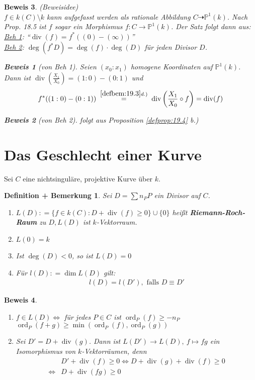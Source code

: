 \documentclass[a4paper,12pt]{report}
\theoremstyle{break}
\newtheorem{DefBem}[Def]{Definition + Bemerkung}
\theoremstyle{nonumberbreak}
\theoremstyle{nonumberplain}
\newtheorem{Bew}{Beweis}
\newcommand{\emp}[1]{\textbf{\emph{#1}}}
\newcommand{\begriff}[1]{{\index{#1}}\emp{#1}}
\newcommand{\defeqr}[0]{\mathrel{\mathop:}=}
\newcommand{\gleichwegen}[1]{\ensuremath{\DOTSB\;\stackrel{#1}{=}\;}}
\DeclareMathOperator{\ord}{ord}
\begin{document}
\begin{Bew}
(Beweisidee)\\
$f\in k(C)\setminus k$ kann aufgefasst werden als rationale Abbildung $C\dashrightarrow\mathbb{P}^1(k)$. Nach Prop. 18.5 ist $f$ sogar ein Morphismus $f: C \rightarrow\mathbb{P}^1(k)$. Der Satz folgt dann aus:\\
\underline{Beh 1}: ``$\operatorname{div}(f)=f^*((0)-(\infty))$''\\
\underline{Beh 2}: $\deg(f^*D)= \deg(f)\cdot\deg(D)$ für jeden Divisor $D$. 
\begin{Bew}[von Beh 1]
  Seien $(x_0:x_1)$ homogene Koordinaten auf $\mathbb P^1(k)$. Dann ist $\operatorname{div}(\frac{X_1}{X_0})=(1:0)-(0:1)$ und 
  \begin{align*}
    f^*((1:0)-(0:1))\gleichwegen{\ref{defbem:19.3} d.)}\operatorname{div}\left(\frac{X_1}{X_0}\circ f\right)=\operatorname{div}(f)
  \end{align*}
\end{Bew}
\begin{Bew}[von Beh 2]
  folgt aus Proposition \ref{defprop:19.4} b.)
\end{Bew}
\end{Bew}

\section{Das Geschlecht einer Kurve}
Sei $C$ eine nichtsinguläre, projektive Kurve über $k$.
\begin{DefBem}
  \label{defbem:20.1}
  Sei $D=\sum n_PP$ ein Divisor auf $C$. 
  \begin{enumerate}
  \item $L(D)\defeqr\{f\in k(C):D+\operatorname{div}(f)\geq0\}\cup\{0\}$ heißt \begriff{Riemann-Roch-Raum} zu $D, L(D)$ ist $k$-Vektorraum.
  \item $L(0)=k$
  \item Ist $\deg(D)<0$, so ist $L(D)=0$
  \item Für $l(D)\defeqr\dim L(D)$ gilt:
    \begin{align*}
      l(D)=l(D'),\text{ falls } D\equiv D'
    \end{align*}
  \end{enumerate}
\end{DefBem}

\begin{Bew}
  \begin{enumerate}
  \item $f\in L(D)\Leftrightarrow$ für jedes $P\in C$ ist $\ord_P(f)\geq-n_P$ \\
    $\ord_P(f+g)\geq\min(\ord_P(f),\ord_P(g))$
  \item[(d)] Sei $D'=D+\operatorname{div}(g)$. Dann ist $L(D')\longrightarrow L(D),~ f\mapsto fg$ ein Isomorphismus von $k$-Vektorräumen, denn
    \begin{align*}
      & D'+\operatorname{div}(f)\geq 0 \Leftrightarrow D+\operatorname{div}(g)+\operatorname{div}(f)\geq 0 \\
      \Leftrightarrow & D+\operatorname{div}(fg)\geq 0
    \end{align*}
  \end{enumerate}
\end{Bew}
\end{document}
